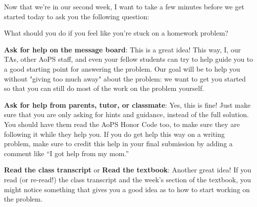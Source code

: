 Now that we're in our second week, I want to take a few minutes before we get started today to ask you the following question:

What should you do if you feel like you're stuck on a homework problem?







\textbf{Ask for help on the message board}: This is a great idea! This way, I, our TAs, other AoPS staff, and even your fellow students can try to help guide you to a good starting point for answering the problem. Our goal will be to help you without "giving too much away" about the problem: we want to get you started so that you can still do most of the work on the problem yourself.


\textbf{Ask for help from parents, tutor, or classmate}: Yes, this is fine! Just make sure that you are only asking for hints and guidance, instead of the full solution. You should have them read the AoPS Honor Code too, to make sure they are following it while they help you. If you do get help this way on a writing problem, make sure to credit this help in your final submission by adding a comment like “I got help from my mom.”



\textbf{Read the class transcript} or \textbf{Read the textbook}: Another great idea! If you read (or re-read!) the class transcript and the week's section of the textbook, you might notice something that gives you a good idea as to how to start working on the problem.

